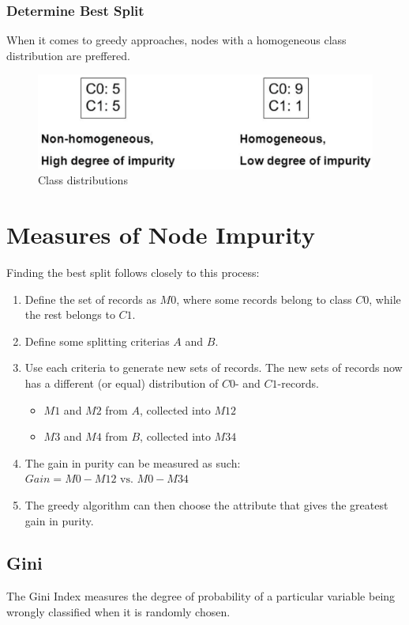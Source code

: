 \subsubsection{Determine Best Split}
When it comes to greedy approaches, nodes with a homogeneous class distribution are preffered.
\bigskip
\begin{figure}[H]
    \centering
    \includegraphics[scale=0.5]{figures/bestsplit.png}
    \caption{Class distributions}
\end{figure}

\section{Measures of Node Impurity}
Finding the best split follows closely to this process:

\begin{enumerate}
    \item Define the set of records as $M0$, where some records belong to class $C0$, while the rest belongs to $C1$.
    \item Define some splitting criterias $A$ and $B$.
    \item Use each criteria to generate new sets of records. The new sets of records now has a different (or equal) distribution of $C0$- and $C1$-records.
    \begin{itemize}
        \item $M1$ and $M2$ from $A$, collected into $M12$
        \item $M3$ and $M4$ from $B$, collected into $M34$
    \end{itemize}
    \item The gain in purity can be measured as such: $Gain = M0 - M12 \text{ vs. } M0 - M34$
    \item The greedy algorithm can then choose the attribute that gives the greatest gain in purity.
\end{enumerate}

\newpage
\subsection{Gini}
The Gini Index measures the degree of probability of a particular variable being wrongly classified when it is randomly chosen.

